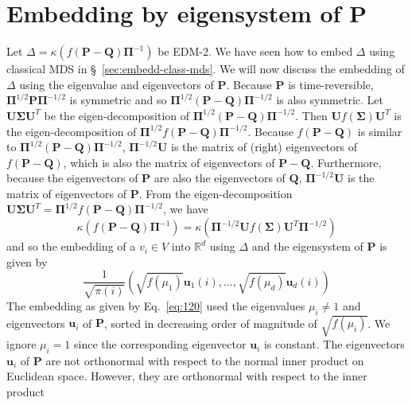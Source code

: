 \section{Embedding by eigensystem of P}
\label{sec:embedd-eigensyst-p}
Let $\Delta = \kappa(f(\mathbf{P} - \mathbf{Q})\bm{\Pi}^{-1})$ be
EDM-2. We have seen how to embed $\Delta$ using classical MDS in
\S~\ref{sec:embedd-class-mds}. We will now discuss the embedding of
$\Delta$ using the eigenvalue and eigenvectors of
$\mathbf{P}$. Because $\mathbf{P}$ is time-reversible, $\bm{\Pi}^{1/2}
\mathbf{P} \bm{\Pi}^{-1/2}$ is symmetric and so
$\bm{\Pi}^{1/2}(\mathbf{P} - \mathbf{Q})\bm{\Pi}^{-1/2}$ is also
symmetric. Let $\mathbf{U} \bm{\Sigma} \mathbf{U}^{T}$ be the
eigen-decomposition of $\bm{\Pi}^{1/2}(\mathbf{P} -
\mathbf{Q})\bm{\Pi}^{-1/2}$. Then $\mathbf{U} f(\bm{\Sigma})
\mathbf{U}^{T}$ is the eigen-decomposition of $\bm{\Pi}^{1/2}
f(\mathbf{P} - \mathbf{Q}) \bm{\Pi}^{-1/2}$. Because $f(\mathbf{P} -
\mathbf{Q})$ is similar to $\bm{\Pi}^{1/2}(\mathbf{P} -
\mathbf{Q})\bm{\Pi}^{-1/2}$, $\bm{\Pi}^{-1/2}\mathbf{U}$ is the matrix
of (right) eigenvectors of $f(\mathbf{P} - \mathbf{Q})$, which is also
the matrix of eigenvectors of $\mathbf{P} - \mathbf{Q}$. Furthermore,
because the eigenvectors of $\mathbf{P}$ are also the eigenvectors of
$\mathbf{Q}$, $\bm{\Pi}^{-1/2}\mathbf{U}$ is the matrix of
eigenvectors of $\mathbf{P}$. From the eigen-decomposition
$\mathbf{U}\bm{\Sigma}\mathbf{U}^{T} =
\bm{\Pi}^{1/2}f(\mathbf{P}-\mathbf{Q})\bm{\Pi}^{-1/2}$, we have
\begin{equation*}
    \kappa(f(\mathbf{P} - \mathbf{Q})\bm{\Pi}^{-1})=
    \kappa(\bm{\Pi}^{-1/2}\mathbf{U}f(\bm{\Sigma})\mathbf{U}^{T}\bm{\Pi}^{-1/2})
\end{equation*}
and so the embedding of a $v_i \in V$ into $\mathbb{R}^{d}$ using
$\Delta$ and the eigensystem of $\mathbf{P}$ is given by
\begin{equation}
  \label{eq:120}
   \frac{1}{\sqrt{\pi(i)}} (\sqrt{f(\mu_1)} \mathbf{u}_1(i),
    \dots, \sqrt{f(\mu_d)} \mathbf{u}_{d}(i))
\end{equation}
The embedding as given by Eq.~\eqref{eq:120} used the eigenvalues
$\mu_i \not= 1$ and eigenvectors $\mathbf{u}_i$ of $\mathbf{P}$,
sorted in decreasing order of magnitude of $\sqrt{f(\mu_i)}$. We
ignore $\mu_i = 1$ since the corresponding eigenvector $\mathbf{u}_i$
is constant. The eigenvectors $\mathbf{u}_i$ of $\mathbf{P}$ are not
orthonormal with respect to the normal inner product on Euclidean
space. However, they are orthonormal with respect to the inner product
